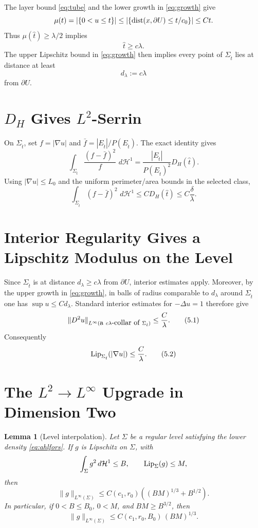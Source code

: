 \documentclass[11pt]{article}
\newtheorem{lemma}[theorem]{Lemma}
\newcommand{\dH}{\,d\mathcal H^1}
\begin{document}
The layer bound \eqref{eq:tube} and the lower growth in \eqref{eq:growth}
give
\[
   \mu(t)
      =
      |\{0<u\le t\}|
      \le
      |\{{\rm dist}(x,\partial U)\le t/c_0\}|
      \le
      C t.
\]
Thus \(\mu(\hat t)\ge\lambda/2\) implies
\[
   \hat t\ge c\lambda.
   \tag{3.2}\label{eq:t-lower}
\]
The upper Lipschitz bound in \eqref{eq:growth} then implies every point of
\(\Sigma_{\hat t}\) lies at distance at least
\[
   d_\lambda:=c\lambda
   \tag{3.3}\label{eq:dist-lower}
\]
from \(\partial U\).

\section{\(D_H\) Gives \(L^2\)-Serrin}

On \(\Sigma_{\hat t}\), set \(f=|\nabla u|\) and
\(\bar f=|E_{\hat t}|/P(E_{\hat t})\).  The exact identity gives
\[
   \int_{\Sigma_{\hat t}}\frac{(f-\bar f)^2}{f}\,\dH
      =
      \frac{|E_{\hat t}|}{P(E_{\hat t})^2}D_H(\hat t).
\]
Using \(|\nabla u|\le L_0\) and the uniform perimeter/area bounds in the
selected class,
\[
   \int_{\Sigma_{\hat t}}(f-\bar f)^2\,\dH
      \le C D_H(\hat t)
      \le C\frac{\delta}{\lambda}.
   \tag{4.1}\label{eq:l2-lambda}
\]

\section{Interior Regularity Gives a Lipschitz Modulus on the Level}

Since \(\Sigma_{\hat t}\) is at distance \(d_\lambda\ge c\lambda\) from
\(\partial U\), interior estimates apply.  Moreover, by the upper growth in
\eqref{eq:growth}, in balls of radius comparable to \(d_\lambda\) around
\(\Sigma_{\hat t}\) one has \(\sup u\le C d_\lambda\).  Standard interior
estimates for \(-\Delta u=1\) therefore give
\[
   \|D^2u\|_{L^\infty(\hbox{a }c\lambda\hbox{-collar of }\Sigma_{\hat t})}
      \le \frac{C}{\lambda}.
   \tag{5.1}\label{eq:hessian}
\]
Consequently
\[
   {\rm Lip}_{\Sigma_{\hat t}}(|\nabla u|)
      \le \frac{C}{\lambda}.
   \tag{5.2}\label{eq:f-lip}
\]

\section{The \(L^2\to L^\infty\) Upgrade in Dimension Two}

\begin{lemma}[Level interpolation]\label{lem:interp}
Let \(\Sigma\) be a regular level satisfying the lower density
\eqref{eq:ahlfors}.  If \(g\) is Lipschitz on \(\Sigma\), with
\[
   \int_\Sigma g^2\,d\mathcal H^1\le B,
   \qquad
   {\rm Lip}_\Sigma(g)\le M,
\]
then
\[
   \|g\|_{L^\infty(\Sigma)}
      \le C(c_1,r_0)\left((BM)^{1/3}+B^{1/2}\right).
\]
In particular, if \(0<B\le B_0\), \(0<M\), and \(BM\ge B^{3/2}\), then
\[
   \|g\|_{L^\infty(\Sigma)}
      \le C(c_1,r_0,B_0)\,(BM)^{1/3}.
\]
\end{lemma}
\end{document}
